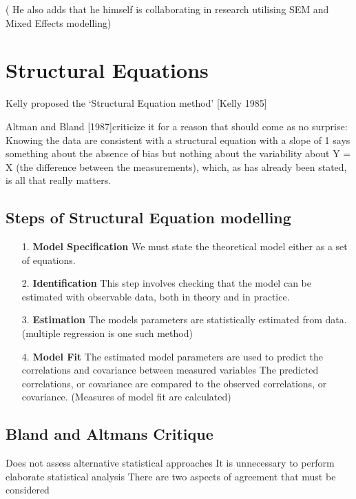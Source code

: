 \documentclass[12pt, a4paper]{report}
\theoremstyle{plain}
\theoremstyle{definition}
\theoremstyle{remark}
\begin{document}
( He also adds that he himself is collaborating in research utilising SEM and Mixed Effects modelling)
\section{Structural Equations}

Kelly proposed the ‘Structural Equation method’ [Kelly 1985]

Altman and Bland [1987]criticize it for a reason that should come as no surprise: 
Knowing the data are consistent with a structural equation with a slope of 1 says something 
about the absence of bias but nothing about the variability about Y = X (the difference between the measurements), which, as has already been stated, is all that really matters.

\subsection{Steps of Structural Equation modelling}

\begin{itemize}
\item[1.] \textbf{Model Specification}
We must state the theoretical model either as a set of equations.

\item[2.] \textbf{Identification }
This step involves checking that the model can be estimated with observable data, both in theory and in practice.

\item[3.] \textbf{Estimation}
The models parameters are statistically estimated from data. (multiple regression is one such method)

\item[4.] \textbf{Model Fit}
The estimated model parameters are used to predict the correlations and covariance between measured variables 
The predicted correlations, or covariance are compared to the observed correlations, or covariance. (Measures of model fit are calculated)
\end{itemize}
\subsection{Bland and Altmans Critique}

Does not assess alternative statistical approaches
It is unnecessary to perform elaborate statistical analysis
There are two aspects of agreement that must be considered
\end{document}
